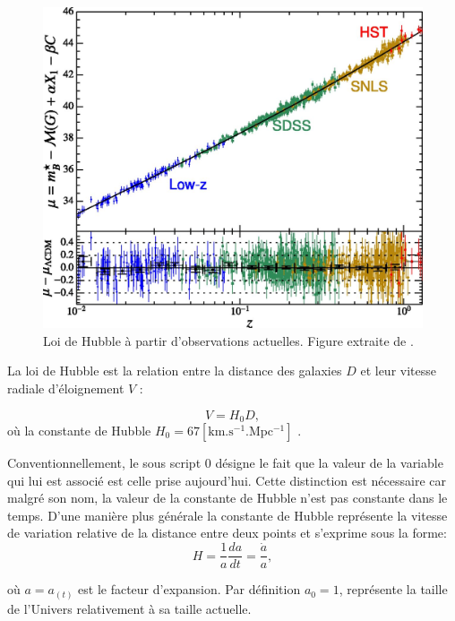 \begin{figure}[bth]
        \includegraphics[width=.9\linewidth]{img/01/hubble_law.jpg} 
        \caption[Loi de Hubble]{Loi de Hubble à partir d'observations actuelles. 
        Figure extraite de \citep{2015PNAS..112.3173B}.
        }
 		\label{fig:hubble_law}
\end{figure}

La loi de Hubble est la relation entre la distance des galaxies $D$ et leur vitesse radiale d'éloignement $V$ : %

\begin{equation}
V = H_0 D,
\end{equation}
où la constante de Hubble $H_0 = 67 \mathrm{ \left[ km.s^{-1}.Mpc^{-1} \right ] }$  \citep{planck_collaboration_planck_2016}.

Conventionnellement, le sous script $0$ désigne le fait que la valeur de la variable qui lui est associé est celle prise aujourd'hui.
Cette distinction est nécessaire car malgré son nom, la valeur de la constante de Hubble n'est pas constante dans le temps.
D'une manière plus générale la constante de Hubble représente la vitesse de variation relative de la distance entre deux points et s'exprime sous la forme:
\begin{equation}
H=\frac{1}{a} \frac{da}{dt} = \frac{\dot{a}}{a},
\end{equation}

où $a = a_{(t)}$ est le facteur d'expansion.
Par définition $a_0 = 1$,  représente la taille de l'Univers relativement à sa taille actuelle.

